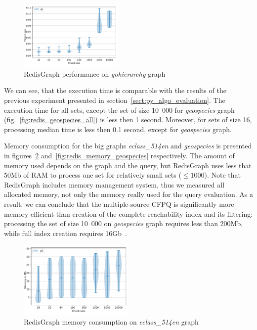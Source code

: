 \begin{figure}[h]
\centering
\includegraphics[width=0.45\textwidth]{data/raw_redis/gohierarchy.pdf}
\caption{RedisGraph performance on \textit{gohierarchy} graph}
\label{fig:redis_gohierarchy_all}
\end{figure}

We can see, that the execution time is comparable with the results of the previous experiment presented in section~\ref{sect:py_algo_evaluation}.
The execution time for all sets, except the set of size 10~000 for \textit{geospecies} graph (fig.~\ref{fig:redis_geospecies_all}) is less then 1 second.
Moreover, for sets of size 16, processing median time is less then 0.1 second, except for \textit{geospecies} graph.

Memory consumption for the big graphs \textit{eclass\_514en} and \textit{geospecies} is presented in figures~\ref{fig:redis_memory_eclass} and~\ref{fig:redis_memory_geospecies} respectively.
The amount of memory used depends on the graph and the query, but RedisGraph uses less that 50Mb of RAM to process one set for relatively small sets ($\leq 1000$).
Note that RedisGraph includes memory management system, thus we measured all allocated memory, not only the memory really used for the query evaluation.
As a result, we can conclude that the multiple-source CFPQ is significantly more memory efficient than creation of the complete reachability index and its filtering: processing the set of size 10~000 on \textit{geospecies} graph requires less than 200Mb, while full index creation requires 16Gb~\cite{10.1145/3398682.3399163}.

\begin{figure}[h]
\centering
\includegraphics[width=0.5\textwidth]{data/raw_memory/eclass_514en.pdf}
\caption{RedisGraph memory consumption on \textit{eclass\_514en} graph}
\label{fig:redis_memory_eclass}
\end{figure}

